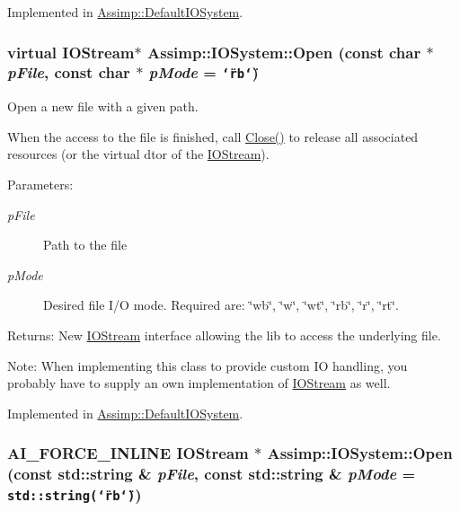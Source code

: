 Implemented in \hyperlink{class_assimp_1_1_default_i_o_system_154a94adf38921d9fce50ef598f0a50c}{Assimp::DefaultIOSystem}.\hypertarget{class_assimp_1_1_i_o_system_c512ece3b0701de5682553007a4c0816}{
\subsubsection[Open]{\setlength{\rightskip}{0pt plus 5cm}virtual {\bf IOStream}$\ast$ Assimp::IOSystem::Open (const char $\ast$ {\em pFile}, \/  const char $\ast$ {\em pMode} = {\tt \char`\"{}rb\char`\"{}})}}
\label{class_assimp_1_1_i_o_system_c512ece3b0701de5682553007a4c0816}


Open a new file with a given path. 

When the access to the file is finished, call \hyperlink{class_assimp_1_1_i_o_system_8c334d60f04bceeb6bd0157d21723f3e}{Close()} to release all associated resources (or the virtual dtor of the \hyperlink{class_assimp_1_1_i_o_stream}{IOStream}).

\begin{Desc}
\item[Parameters:]
\begin{description}
\item[{\em pFile}]Path to the file \item[{\em pMode}]Desired file I/O mode. Required are: \char`\"{}wb\char`\"{}, \char`\"{}w\char`\"{}, \char`\"{}wt\char`\"{}, \char`\"{}rb\char`\"{}, \char`\"{}r\char`\"{}, \char`\"{}rt\char`\"{}.\end{description}
\end{Desc}
\begin{Desc}
\item[Returns:]New \hyperlink{class_assimp_1_1_i_o_stream}{IOStream} interface allowing the lib to access the underlying file. \end{Desc}
\begin{Desc}
\item[Note:]When implementing this class to provide custom IO handling, you probably have to supply an own implementation of \hyperlink{class_assimp_1_1_i_o_stream}{IOStream} as well. \end{Desc}


Implemented in \hyperlink{class_assimp_1_1_default_i_o_system_9c8da3d63312f47b2dec83ec90aa2c4d}{Assimp::DefaultIOSystem}.\hypertarget{class_assimp_1_1_i_o_system_ef35fabc9bd49fb83bfd4f12a94083c3}{
\subsubsection[Open]{\setlength{\rightskip}{0pt plus 5cm}AI\_\-FORCE\_\-INLINE {\bf IOStream} $\ast$ Assimp::IOSystem::Open (const std::string \& {\em pFile}, \/  const std::string \& {\em pMode} = {\tt std::string(\char`\"{}rb\char`\"{})})}}
\label{class_assimp_1_1_i_o_system_ef35fabc9bd49fb83bfd4f12a94083c3}



